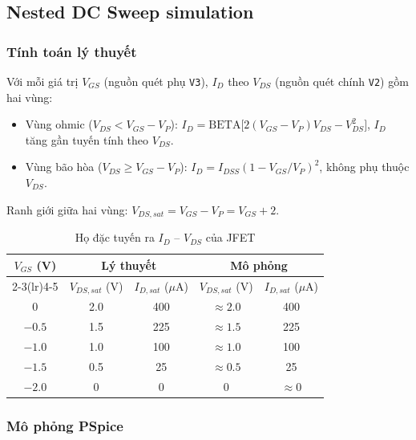 \subsection{Nested DC Sweep simulation \bonus}\label{sec:jfet-nested}

\subsubsection*{Tính toán lý thuyết}
Với mỗi giá trị $V_{GS}$ (nguồn quét phụ \texttt{V3}), $I_D$ theo $V_{DS}$ (nguồn quét chính \texttt{V2}) gồm hai vùng:
\begin{itemize}[nosep]
  \item Vùng ohmic ($V_{DS} < V_{GS} - V_P$): $I_D = \text{BETA}\bigl[2(V_{GS} - V_P)V_{DS} - V_{DS}^2\bigr]$, $I_D$ tăng gần tuyến tính theo $V_{DS}$.
  \item Vùng bão hòa ($V_{DS} \ge V_{GS} - V_P$): $I_D = I_{DSS}(1 - V_{GS}/V_P)^2$, không phụ thuộc $V_{DS}$.
\end{itemize}
Ranh giới giữa hai vùng: $V_{DS,sat} = V_{GS} - V_P = V_{GS} + 2$.

\begin{table}[H]
\centering
\begin{tabular}{c c c c c}
\toprule
\multirow{2}{*}{$V_{GS}$ (V)} & \multicolumn{2}{c}{\textbf{Lý thuyết}} & \multicolumn{2}{c}{\textbf{Mô phỏng}}\\
\cmidrule(lr){2-3}\cmidrule(lr){4-5}
 & $V_{DS,sat}$ (V) & $I_{D,sat}$ ($\mu$A) & $V_{DS,sat}$ (V) & $I_{D,sat}$ ($\mu$A)\\
\midrule
$0$    & 2.0 & 400 & $\approx 2.0$ & 400\\
$-0.5$ & 1.5 & 225 & $\approx 1.5$ & 225\\
$-1.0$ & 1.0 & 100 & $\approx 1.0$ & 100\\
$-1.5$ & 0.5 & 25  & $\approx 0.5$ & 25\\
$-2.0$ & 0   & 0   & $0$ & $\approx 0$\\
\bottomrule
\end{tabular}
\caption{Họ đặc tuyến ra $I_D$ -- $V_{DS}$ của JFET}
\end{table}

\subsubsection*{Mô phỏng PSpice}
\simresult
{}

